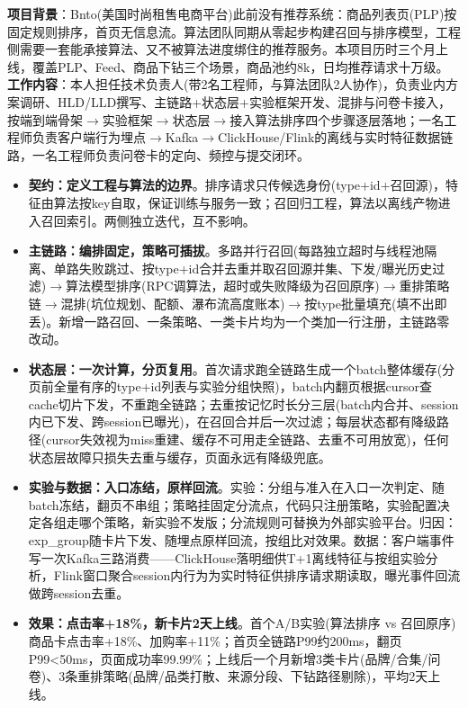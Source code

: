 \documentclass{resume}
\begin{document}
\begin{onehalfspacing}
\textbf{项目背景}：Bnto(美国时尚租售电商平台)此前没有推荐系统：商品列表页(PLP)按固定规则排序，首页无信息流。算法团队同期从零起步构建召回与排序模型，工程侧需要一套能承接算法、又不被算法进度绑住的推荐服务。本项目历时三个月上线，覆盖PLP、Feed、商品下钻三个场景，商品池约8k，日均推荐请求十万级。\\

\textbf{工作内容}：本人担任技术负责人(带2名工程师，与算法团队2人协作)，负责业内方案调研、HLD/LLD撰写、主链路+状态层+实验框架开发、混排与问卷卡接入，按端到端骨架$\rightarrow$实验框架$\rightarrow$状态层$\rightarrow$接入算法排序四个步骤逐层落地；一名工程师负责客户端行为埋点$\rightarrow$Kafka$\rightarrow$ClickHouse/Flink的离线与实时特征数据链路，一名工程师负责问卷卡的定向、频控与提交闭环。\\

\begin{itemize}
    \item \textbf{契约：定义工程与算法的边界}。排序请求只传候选身份(type+id+召回源)，特征由算法按key自取，保证训练与服务一致；召回归工程，算法以离线产物进入召回索引。两侧独立迭代，互不影响。
    \item \textbf{主链路：编排固定，策略可插拔}。多路并行召回(每路独立超时与线程池隔离、单路失败跳过、按type+id合并去重并取召回源并集、下发/曝光历史过滤)$\rightarrow$算法模型排序(RPC调算法，超时或失败降级为召回原序)$\rightarrow$重排策略链$\rightarrow$混排(坑位规划、配额、瀑布流高度账本)$\rightarrow$按type批量填充(填不出即丢)。新增一路召回、一条策略、一类卡片均为一个类加一行注册，主链路零改动。
    \item \textbf{状态层：一次计算，分页复用}。首次请求跑全链路生成一个batch整体缓存(分页前全量有序的type+id列表与实验分组快照)，batch内翻页根据cursor查cache切片下发，不重跑全链路；去重按记忆时长分三层(batch内合并、session内已下发、跨session已曝光)，在召回合并后一次过滤；每层状态都有降级路径(cursor失效视为miss重建、缓存不可用走全链路、去重不可用放宽)，任何状态层故障只损失去重与缓存，页面永远有降级兜底。
    \item \textbf{实验与数据：入口冻结，原样回流}。实验：分组与准入在入口一次判定、随batch冻结，翻页不串组；策略挂固定分流点，代码只注册策略，实验配置决定各组走哪个策略，新实验不发版；分流规则可替换为外部实验平台。归因：exp\_group随卡片下发、随埋点原样回流，按组比对效果。数据：客户端事件写一次Kafka三路消费——ClickHouse落明细供T+1离线特征与按组实验分析，Flink窗口聚合session内行为为实时特征供排序请求期读取，曝光事件回流做跨session去重。
    \item \textbf{效果：点击率+18\%，新卡片2天上线}。首个A/B实验(算法排序 vs 召回原序)商品卡点击率+18\%、加购率+11\%；首页全链路P99约200ms，翻页P99<50ms，页面成功率99.99\%；上线后一个月新增3类卡片(品牌/合集/问卷)、3条重排策略(品牌/品类打散、来源分段、下钻路径剔除)，平均2天上线。
\end{itemize}
\end{onehalfspacing}
\end{document}
